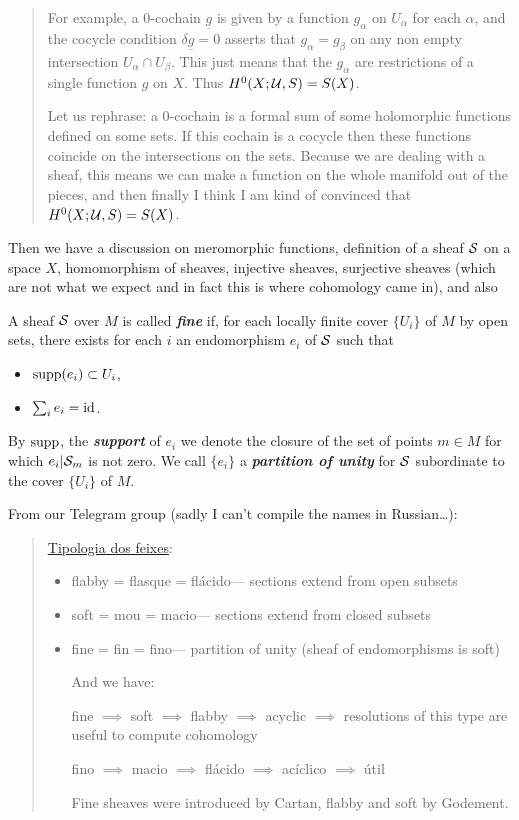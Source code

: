 \begin{quote}
	For example, a 0-cochain $\underline{g}$ is given by a function $g_\alpha$ on $U_\alpha$ for each $\alpha$, and the cocycle condition $\delta\underline{g}=0$ asserts that $g_\alpha=g_\beta$ on any non empty intersection $U_\alpha\cap U_\beta$. This just means that the $g_\alpha$ are restrictions of a single function $g$ on $X$. Thus $H^0(X;\mathcal{U},S)=S(X)$.
	
	{\color{cyan}Let us rephrase: a 0-cochain is a formal sum of some holomorphic functions defined on some sets. If this cochain is a cocycle then these functions coincide on the intersections on the sets. Because we are dealing with a sheaf, this means we can make a function on the whole manifold out of the pieces,} {\color{magenta}and then finally I think I am kind of convinced that $H^0(X;\mathcal{U},S)=S(X)$.}
\end{quote}
{\color{cyan}Then we have a discussion on meromorphic functions, definition of a sheaf $\mathcal{S}$ on a space $X$, homomorphism of sheaves, injective sheaves, surjective sheaves (which are not what we expect and in fact this is where cohomology came in), and also}
\begin{defn}
	A sheaf $\mathcal{S}$ over $M$ is called \textbf{\textit{fine}} if, for each locally finite cover $\{U_i\}$ of $M$ by open sets, there exists for each $i$ an endomorphism $e_i$ of $\mathcal{S}$ such that
	\begin{itemize}
		\item $\operatorname{supp}(e_i)\subset U_i$,
		\item $\sum_ie_i=\operatorname{id}$.
	\end{itemize}
	By $\operatorname{supp}$, the \textbf{\textit{support}} of $e_i$ we denote the closure of the set of points $m\in M$ for which $e_i|\mathcal{S}_m$ is not zero. We call $\{e_i\}$ a \textbf{\textit{partition of unity}} for $\mathcal{S}$ subordinate to the cover $\{U_i\}$ of $M$.
\end{defn}
From our Telegram group (sadly I can't compile the names in Russian…):
\begin{quote}
	\href{https://fr.wikipedia.org/wiki/Faisceau_(mathématiques)#Typologie_des_faisceaux}{Tipologia dos feixes}:
	\begin{itemize}
		\item flabby = flasque
			= flácido--- sections extend from open subsets
		\item soft = mou
			= macio--- sections extend from closed subsets
		\item fine = fin
	 		= fino--- partition of unity (sheaf of endomorphisms is soft)
	
	And we have:
	
	fine $\implies$ soft $\implies$ flabby $\implies$ acyclic $\implies$ resolutions of this type are useful to compute cohomology
	
	fino $\implies$ macio $\implies$ flácido $\implies$ acíclico $\implies$ útil

	Fine sheaves were introduced by Cartan, flabby and soft by Godement.
	\end{itemize}
\end{quote}

